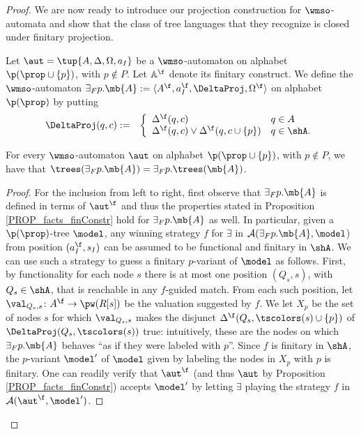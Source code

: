 \begin{proof}
We are now ready to introduce our projection construction for $\wmso$-automata and show that the class of tree languages that they recognize is closed under finitary
projection.
\begin{definition}\label{DEF_fin_projection}
Let $\aut = \tup{A,\Delta,\Omega,a_I}$ be a $\wmso$-automaton on alphabet $\p(\prop \cup \{p\})$, with $p \not\in P$. Let $\mathbb{A}^{\f}$
denote its finitary construct.
We define the $\wmso$-automaton ${{\exists}_F p}.\mb{A} := \langle A^{\f}, a_I^{\f},
\DeltaProj, \Omega^{\f}\rangle$ on alphabet $\p(\prop)$ by putting
\begin{eqnarray*}
\DeltaProj(q,c) &:=& \left\{
	\begin{array}{ll}
        \Delta^{\f}(q,c) & q\in A \\
		\Delta^{\f}(q,c) \vee \Delta^{\f}(q,c\cup\{p\}) & q \in \shA.
	\end{array}
\right.
\end{eqnarray*}
\end{definition}
\begin{proposition}\label{PROP_fin_projection}
For every $\wmso$-automaton $\aut$ on alphabet ${\p (\prop \cup \{p\})}$, with $p \not\in P$, we have that $\trees({{\exists}_F p}.\mb{A}) = {{\exists}_F p}.\trees(\mb{A})$.
\end{proposition}

\begin{proof} %
For the inclusion from left to right, first observe that ${{\exists}_F p}.\mb{A}$ is defined in terms of $\aut^{\f}$ and thus the properties stated in Proposition \ref{PROP_facts_finConstr} hold for ${{\exists}_F p}.\mb{A}$ as well. In particular, given a ${\p (\prop)}$-tree $\model$, any winning strategy $f$ for $\exists$ in $\mathcal{A}({{\exists}_F p}.\mb{A}, \model$) from position $(a_I^{\f},s_I)$ can be assumed to be functional and finitary in $\shA$. We can use such a strategy to guess a finitary $p$-variant of $\model$ as follows. First, by functionality for each node $s$ there is at most one position $(Q_s,s)$, with $Q_s \in \shA$, that is reachable in any $f$-guided match. From each such position, let $\val_{Q_s,s} \colon A^{\f} \to \pw (R[s])$ be the valuation suggested by $f$. We let $X_p$ be the set of nodes $s$ for which $\val_{Q_s,s}$ makes the disjunct $\Delta^{\f}(Q_s,\tscolors(s)\cup\{p\})$ of $\DeltaProj(Q_s,\tscolors(s))$ true: intuitively, these are the nodes on which ${{\exists}_F p}.\mb{A}$ behaves ``as if they were labeled with $p$''. Since $f$ is finitary in $\shA$, the $p$-variant $\model'$ of $\model$ given by labeling the nodes in $X_p$ with $p$ is finitary. One can readily verify that $\aut^{\f}$ (and thus $\aut$ by Proposition \ref{PROP_facts_finConstr}) accepts $\model'$ by letting $\exists$ playing the strategy $f$ in $\mathcal{A}(\aut^{\f},\model')$.


\end{proof}
\end{proof}
